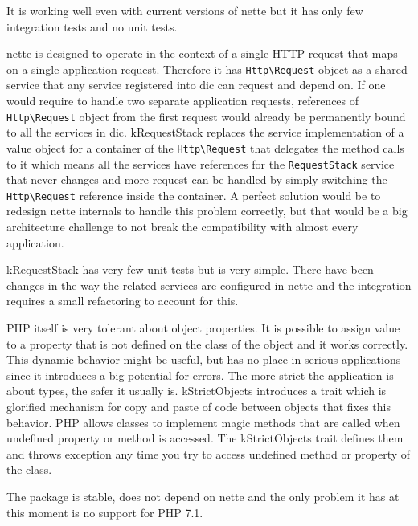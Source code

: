It is working well even with current versions of \gls{nette} but it has only few integration tests and no unit tests.

 \label{sec:state:request-stack}

\gls{nette} is designed to operate in the context of a single HTTP request that maps on a single application request. Therefore it has \lstinline{Http\Request} object as a shared service that any service registered into \gls{dic} can request and depend on. If one would require to handle two separate application requests, references of \lstinline{Http\Request} object from the first request would already be permanently bound to all the services in \gls{dic}. \gls{kRequestStack} replaces the service implementation of a value object for a container of the \lstinline{Http\Request} that delegates the method calls to it which means all the services have references for the \lstinline{RequestStack} service that never changes and more request can be handled by simply switching the \lstinline{Http\Request} reference inside the container. A perfect solution would be to redesign \gls{nette} internals to handle this problem correctly, but that would be a big architecture challenge to not break the compatibility with almost every application.

\gls{kRequestStack} has very few unit tests but is very simple. There have been changes in the way the related services are configured in \gls{nette} and the integration requires a small refactoring to account for this.

 \label{sec:state:strict-objects}

PHP itself is very tolerant about object properties. It is possible to assign value to a property that is not defined on the class of the object and it works correctly. This dynamic behavior might be useful, but has no place in serious applications since it introduces a big potential for errors. The more strict the application is about types, the safer it usually is. \gls{kStrictObjects} introduces a trait which is glorified mechanism for copy and paste of code between objects that fixes this behavior. PHP allows classes to implement magic methods that are called when undefined property or method is accessed. The \gls{kStrictObjects} trait defines them and throws exception any time you try to access undefined method or property of the class.

The package is stable, does not depend on \gls{nette} and the only problem it has at this moment is no support for PHP 7.1.


